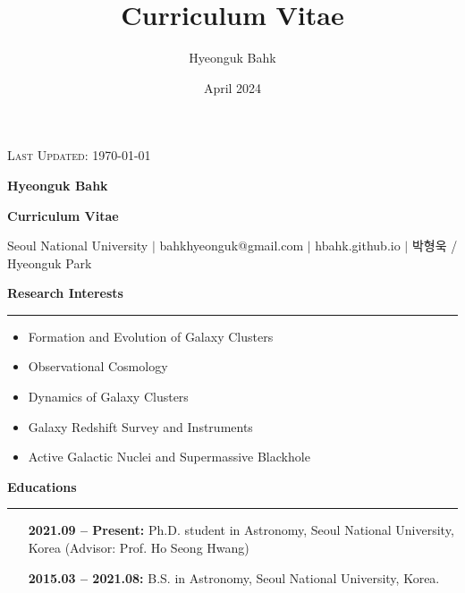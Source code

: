 \documentclass[11pt]{article}
\title{Curriculum Vitae}
\author{Hyeonguk Bahk}
\date{April 2024}
\begin{document}

  \setlength\parindent{0pt}
    \begin{minipage}{1\textwidth}
      \raggedright
      \textsc{Last Updated: \today}
    \end{minipage}

\vspace{15pt}

\begin{center}
{\Large\textsf{\textbf{Hyeonguk Bahk}}}

\vspace{3pt}
\textsf{\textbf{Curriculum Vitae}}

\end{center}

{\small {\footnotesize \faMapMarker*} Seoul National University $|$ {\footnotesize \faEnvelope} bahkhyeonguk@gmail.com $|$ {\footnotesize \faHome} hbahk.github.io $|$ {\scriptsize \faTag} 박형욱 / Hyeonguk Park}

\vspace{15pt}

\textbf{\large \textsf{Research Interests}}
\vspace{3pt}
\hrule
\begin{multicols}{2}
\begin{itemize}[noitemsep, leftmargin=*]
    \item Formation and Evolution of Galaxy Clusters
    \item Observational Cosmology
    \item Dynamics of Galaxy Clusters
    \item Galaxy Redshift Survey and Instruments
    \item Active Galactic Nuclei and Supermassive Blackhole
\end{itemize}
\end{multicols}

\textbf{\large \textsf{Educations}}
\vspace{3pt}
\hrule

\begin{itemize}[leftmargin=115pt]
    \item[\textbf{2021.09 -- Present:}] Ph.D. student in Astronomy, Seoul National University, Korea (Advisor: Prof. Ho Seong Hwang)
    \item[\textbf{2015.03 -- 2021.08:}] B.S. in Astronomy, Seoul National University, Korea.
\end{itemize}
\end{document}
